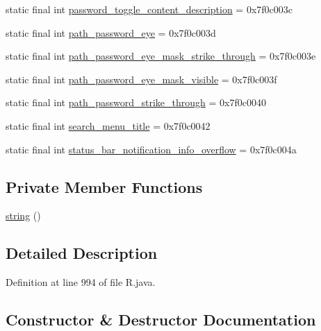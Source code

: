 \begin{DoxyCompactItemize}
\item 
static final int \mbox{\hyperlink{classandroid_1_1support_1_1design_1_1_r_1_1string_a4527efd2dc09f2ef14dc5d29885af2d7}{password\+\_\+toggle\+\_\+content\+\_\+description}} = 0x7f0c003c
\item 
static final int \mbox{\hyperlink{classandroid_1_1support_1_1design_1_1_r_1_1string_aed1c555d135bf6222bcd81421426dc29}{path\+\_\+password\+\_\+eye}} = 0x7f0c003d
\item 
static final int \mbox{\hyperlink{classandroid_1_1support_1_1design_1_1_r_1_1string_a29a5c3f687b185da43894e42ce7815b4}{path\+\_\+password\+\_\+eye\+\_\+mask\+\_\+strike\+\_\+through}} = 0x7f0c003e
\item 
static final int \mbox{\hyperlink{classandroid_1_1support_1_1design_1_1_r_1_1string_a13989fd072bdc21662e0280689488412}{path\+\_\+password\+\_\+eye\+\_\+mask\+\_\+visible}} = 0x7f0c003f
\item 
static final int \mbox{\hyperlink{classandroid_1_1support_1_1design_1_1_r_1_1string_abc8635142311e1011a50dd2be868ce34}{path\+\_\+password\+\_\+strike\+\_\+through}} = 0x7f0c0040
\item 
static final int \mbox{\hyperlink{classandroid_1_1support_1_1design_1_1_r_1_1string_a5b51cc800abfd3edfc464432c67dade9}{search\+\_\+menu\+\_\+title}} = 0x7f0c0042
\item 
static final int \mbox{\hyperlink{classandroid_1_1support_1_1design_1_1_r_1_1string_ae7e600aba7d20d01b5e3b4ccc3847bc9}{status\+\_\+bar\+\_\+notification\+\_\+info\+\_\+overflow}} = 0x7f0c004a
\end{DoxyCompactItemize}
\subsection*{Private Member Functions}
\begin{DoxyCompactItemize}
\item 
\mbox{\hyperlink{classandroid_1_1support_1_1design_1_1_r_1_1string_af65fc1f3b3fb46afe266d6fbc8cc6b50}{string}} ()
\end{DoxyCompactItemize}


\subsection{Detailed Description}


Definition at line 994 of file R.\+java.



\subsection{Constructor \& Destructor Documentation}
\mbox{\label{classandroid_1_1support_1_1design_1_1_r_1_1string_af65fc1f3b3fb46afe266d6fbc8cc6b50}} 
